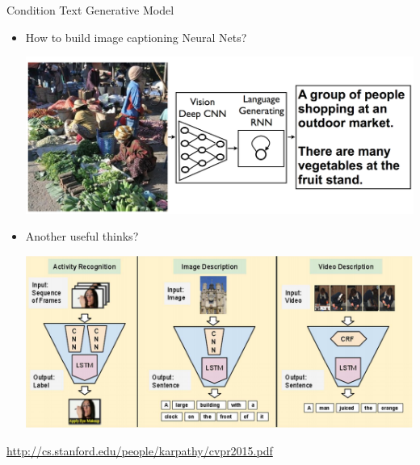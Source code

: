 \documentclass{beamer}
\begin{document}
\begin{frame}{Condition Text Generative Model}
	\begin{itemize}
		\item How to build image captioning Neural Nets?
			\begin{center}
				\includegraphics[scale=0.1]{img/googlernncnn.png}
			\end{center}
		\item Another useful thinks?
					\begin{center}
						\includegraphics[scale=0.17]{img/im2txt}
					\end{center}
	\end{itemize}
	
		 	\begin{tcolorbox}[enhanced,size=fbox,fontupper=\large\bfseries, colback=black!80, colframe=black!80]
		 		\begin{center}
		 			\text{\textcolor{white}{But, extremely complex to train}}
		 		\end{center}
		 	\end{tcolorbox}

	
	\href{http://cs.stanford.edu/people/karpathy/cvpr2015.pdf}{http://cs.stanford.edu/people/karpathy/cvpr2015.pdf}
\end{frame}
\end{document}
